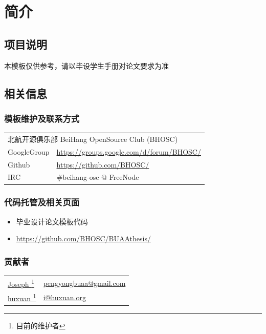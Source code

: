 \chapter{简介}

\section{项目说明}

本模板仅供参考，请以毕设学生手册对论文要求为准

\section{相关信息}

\subsection{模板维护及联系方式}
\begin{tabular}{ll}
    \multicolumn{2}{l}{北航开源俱乐部 BeiHang OpenSource Club (BHOSC)} \\
    GoogleGroup & \url{https://groups.google.com/d/forum/BHOSC/} \\
    Github      & \url{https://github.com/BHOSC/} \\
    IRC         & \#beihang-osc @ FreeNode
\end{tabular}

\subsection{代码托管及相关页面}
\begin{itemize}
    \item 毕业设计论文模板代码
    \item[] \url{https://github.com/BHOSC/BUAAthesis/}
\end{itemize}

\subsection{贡献者}
\begin{tabularx}{\textwidth}{@{\hspace{2em}}ll}
    \href{https://github.com/JosephPeng/}{Joseph \footnote{目前的维护者}} &
    \href{mailto:pengyongbuaa@gmail.com}{pengyongbuaa@gmail.com} \\
    \href{http://huxuan.org/}{huxuan \textsuperscript{1}} &
    \href{mailto:i@huxuan.org}{i@huxuan.org} \\
\end{tabularx}

